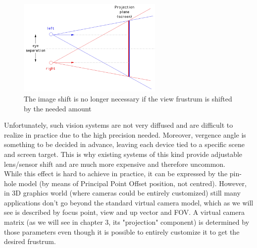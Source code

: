 \begin{figure}
\centering
\includegraphics[width=7cm]{schemas/offaxis}
\caption{The image shift is no longer necessary if the view frustrum is shifted by the needed amount}
\label{fig:offaxis_cameras}
\end{figure}

Unfortunately, such vision systems are not very diffused and are difficult to realize in practice due to the high precision needed. Moreover, vergence angle is something to be decided in advance, leaving each device tied to a specific scene and screen target. This is why existing systems of this kind provide adjustable lens/sensor shift and are much more expensive and therefore uncommon.\\
While this effect is hard to achieve in practice, it can be expressed by the pin-hole model (by means of Principal Point Offset position, not centred). However, in 3D graphics world (where cameras could be entirely customized) still many applications don't go beyond the standard virtual camera model, which as we will see is described by focus point, view and up vector and FOV. A virtual camera matrix (as we will see in chapter 3, its "projection" component) is determined by those parameters even though it is possible to entirely customize it to get the desired frustrum.

